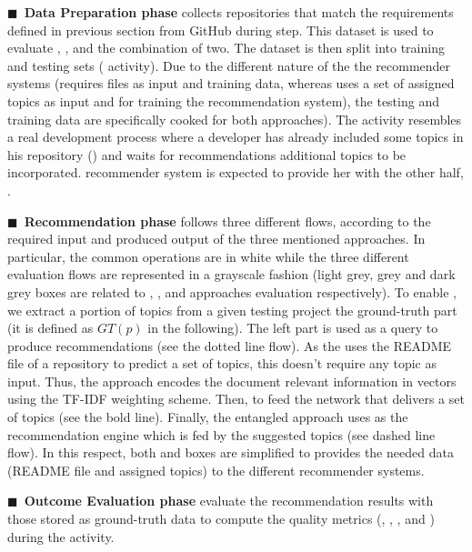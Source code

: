 \noindent
$\blacksquare$~\textbf{Data Preparation phase} collects repositories that match the requirements defined in previous section from GitHub during  step. This dataset is used to evaluate \TF, \MNB, and the combination of two. 
The dataset is then split into training and testing sets (\ie {} activity).
Due to the different nature of the the recommender systems (\ie \MNB requires  files as input and training data, whereas \TF uses a set of assigned topics as input and for training the recommendation system), the testing and training data are specifically cooked for both approaches).
The  activity resembles a real development process where a developer has already included some topics in his repository (\ie {}) and waits for recommendations \ie additional topics to be incorporated. \TF recommender system is expected to provide her with the other half, \ie {}.

\noindent
$\blacksquare$~\textbf{Recommendation phase} follows three different flows, according to the required input and produced output of the three mentioned approaches. In particular, the common operations are in white while the three different evaluation flows are represented in a grayscale fashion (\ie light grey, grey and dark grey boxes are related to \code{\TF}, \code{\MNB}, and  approaches evaluation respectively).
To enable \TF, we extract a portion of topics from a given testing project \ie the ground-truth part (it is defined as $GT(p)$ in the following). The left part is used as a query to produce recommendations (see the dotted line flow). As the \MNB uses the README file of a repository to predict a set of topics, this doesn't require any topic as input. Thus, the approach encodes the document relevant information in vectors using the TF-IDF weighting scheme. Then, to feed the network that delivers a set of topics (see the bold line). Finally, the entangled approach uses \TF as the recommendation engine which is fed by the \MNB suggested topics (see dashed line flow). In this respect, both  and  boxes are simplified to provides the needed data (\ie README file and assigned topics) to the different recommender systems.

\noindent
$\blacksquare$~\textbf{Outcome Evaluation phase} evaluate the recommendation results with those stored as ground-truth data to compute the quality metrics (\ie {}, , , and ) during the  activity.  

